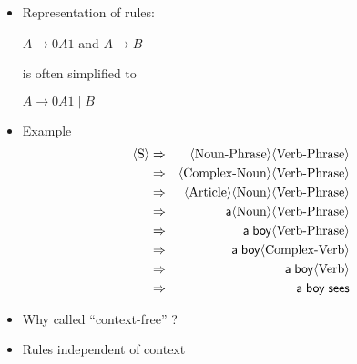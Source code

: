 \begin{frame}[allowframebreaks]
\begin{itemize}
\item Representation of rules:
  \begin{center}
  $A \rightarrow 0A1$
and $A \rightarrow B$
\end{center}
is often simplified to
\begin{center}
$A \rightarrow 0A1\mid B$
\end{center}
\item Example
  \begin{eqnarray*}
    \langle  \text{S} \rangle & \Rightarrow & \langle  \text{Noun-Phrase}\rangle \langle  \text{Verb-Phrase} \rangle\\
& \Rightarrow & \langle  \text{Complex-Noun} \rangle\langle  \text{Verb-Phrase}\rangle\\
& \Rightarrow & \langle  \text{Article} \rangle\langle  \text{Noun}\rangle\langle  \text{Verb-Phrase}\rangle\\
& \Rightarrow & {\sf a} \langle  \text{Noun} \rangle \langle  \text{Verb-Phrase} \rangle\\
& \Rightarrow & {\sf a \; boy} \langle  \text{Verb-Phrase}\rangle\\
& \Rightarrow & {\sf a \; boy} \langle  \text{Complex-Verb}\rangle\\
& \Rightarrow & {\sf a \; boy} \langle  \text{Verb}\rangle\\
& \Rightarrow & {\sf a \; boy \; sees}
  \end{eqnarray*}

\item Why called ``context-free'' ?

\item [] Rules independent of context
  
\end{itemize}\end{frame}

